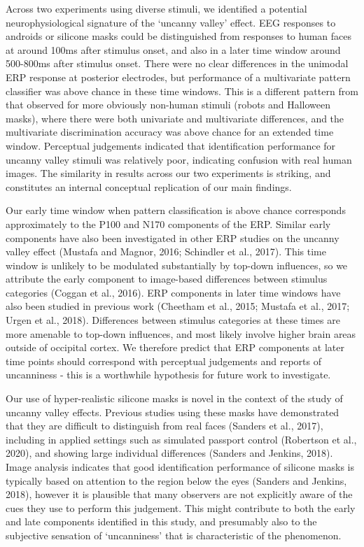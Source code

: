 \documentclass[
]{article}
\begin{document}
Across two experiments using diverse stimuli, we identified a potential neurophysiological signature of the `uncanny valley' effect. EEG responses to androids or silicone masks could be distinguished from responses to human faces at around 100ms after stimulus onset, and also in a later time window around 500-800ms after stimulus onset. There were no clear differences in the unimodal ERP response at posterior electrodes, but performance of a multivariate pattern classifier was above chance in these time windows. This is a different pattern from that observed for more obviously non-human stimuli (robots and Halloween masks), where there were both univariate and multivariate differences, and the multivariate discrimination accuracy was above chance for an extended time window. Perceptual judgements indicated that identification performance for uncanny valley stimuli was relatively poor, indicating confusion with real human images. The similarity in results across our two experiments is striking, and constitutes an internal conceptual replication of our main findings.

Our early time window when pattern classification is above chance corresponds approximately to the P100 and N170 components of the ERP. Similar early components have also been investigated in other ERP studies on the uncanny valley effect (Mustafa and Magnor, 2016; Schindler et al., 2017). This time window is unlikely to be modulated substantially by top-down influences, so we attribute the early component to image-based differences between stimulus categories (Coggan et al., 2016). ERP components in later time windows have also been studied in previous work (Cheetham et al., 2015; Mustafa et al., 2017; Urgen et al., 2018). Differences between stimulus categories at these times are more amenable to top-down influences, and most likely involve higher brain areas outside of occipital cortex. We therefore predict that ERP components at later time points should correspond with perceptual judgements and reports of uncanniness - this is a worthwhile hypothesis for future work to investigate.

Our use of hyper-realistic silicone masks is novel in the context of the study of uncanny valley effects. Previous studies using these masks have demonstrated that they are difficult to distinguish from real faces (Sanders et al., 2017), including in applied settings such as simulated passport control (Robertson et al., 2020), and showing large individual differences (Sanders and Jenkins, 2018). Image analysis indicates that good identification performance of silicone masks is typically based on attention to the region below the eyes (Sanders and Jenkins, 2018), however it is plausible that many observers are not explicitly aware of the cues they use to perform this judgement. This might contribute to both the early and late components identified in this study, and presumably also to the subjective sensation of `uncanniness' that is characteristic of the phenomenon.
\end{document}
